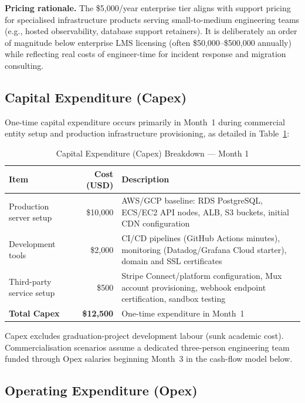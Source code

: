 \textbf{Pricing rationale.}
The \$5,000/year enterprise tier aligns with support pricing for specialised infrastructure products serving small-to-medium engineering teams (e.g., hosted observability, database support retainers). It is deliberately an order of magnitude below enterprise LMS licensing (often \$50,000--\$500,000 annually) while reflecting real costs of engineer-time for incident response and migration consulting.

\subsection{Capital Expenditure (Capex)}
\label{subsec:capex}

One-time capital expenditure occurs primarily in Month~1 during commercial entity setup and production infrastructure provisioning, as detailed in Table~\ref{tab:capex-breakdown}:

\begin{table}[H]
  \centering
  \caption{Capital Expenditure (Capex) Breakdown --- Month 1}
  \label{tab:capex-breakdown}
  \begin{tabular}{@{}lrp{7.5cm}@{}}
    \toprule
    \textbf{Item} & \textbf{Cost (USD)} & \textbf{Description} \\
    \midrule
    Production server setup &
    \$10,000 &
    AWS/GCP baseline: RDS PostgreSQL, ECS/EC2 API nodes, ALB, S3 buckets, initial CDN configuration \\
    \addlinespace
    Development tools &
    \$2,000 &
    CI/CD pipelines (GitHub Actions minutes), monitoring (Datadog/Grafana Cloud starter), domain and SSL certificates \\
    \addlinespace
    Third-party service setup &
    \$500 &
    Stripe Connect/platform configuration, Mux account provisioning, webhook endpoint certification, sandbox testing \\
    \midrule
    \textbf{Total Capex} & \textbf{\$12,500} & One-time expenditure in Month~1 \\
    \bottomrule
  \end{tabular}
\end{table}

Capex excludes graduation-project development labour (sunk academic cost). Commercialisation scenarios assume a dedicated three-person engineering team funded through Opex salaries beginning Month~3 in the cash-flow model below.

\subsection{Operating Expenditure (Opex)}
\label{subsec:opex}

